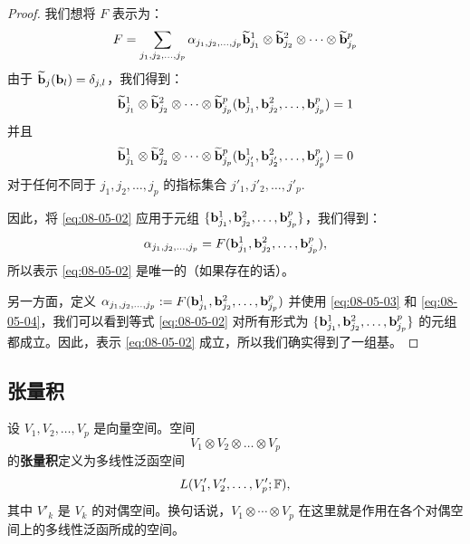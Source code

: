 \begin{proof}
我们想将 $F$ 表示为：
\begin{equation}\label{eq:08-05-02}
F = \sum_{j_1, j_2, \dots, j_p} \alpha_{j_1, j_2, \dots, j_p} \widetilde{\mathbf{b}}^{1}_{j_1} \otimes \widetilde{\mathbf{b}}^{2}_{j_2} \otimes \dots \otimes \widetilde{\mathbf{b}}^{p}_{j_p}
\end{equation}
由于 $\widetilde{\mathbf{b}}_{j}(\mathbf{b}_{l}) = \delta_{j,l}$，我们得到：
\begin{equation}\label{eq:08-05-03}
\widetilde{\mathbf{b}}^{1}_{j_1} \otimes \widetilde{\mathbf{b}}^{2}_{j_2} \otimes \dots \otimes \widetilde{\mathbf{b}}^{p}_{j_p} (\mathbf{b}^{1}_{j_1}, \mathbf{b}^{2}_{j_2}, \dots, \mathbf{b}^{p}_{j_p}) = 1
\end{equation}
并且
\begin{equation}\label{eq:08-05-04}
\widetilde{\mathbf{b}}^{1}_{j_1} \otimes \widetilde{\mathbf{b}}^{2}_{j_2} \otimes \dots \otimes \widetilde{\mathbf{b}}^{p}_{j_p} (\mathbf{b}^{1}_{j'_1}, \mathbf{b}^{2}_{j'_2}, \dots, \mathbf{b}^{p}_{j'_p}) = 0
\end{equation}
对于任何不同于 $j_1, j_2, \dots, j_p$ 的指标集合 $j'_1, j'_2, \dots, j'_p$.

因此，将 \eqref{eq:08-05-02} 应用于元组 $\{\mathbf{b}^{1}_{j_1}, \mathbf{b}^{2}_{j_2}, \dots, \mathbf{b}^{p}_{j_p}\}$，我们得到：
$$ \alpha_{j_1, j_2, \dots, j_p} = F(\mathbf{b}^{1}_{j_1}, \mathbf{b}^{2}_{j_2}, \dots, \mathbf{b}^{p}_{j_p}) ,$$
所以表示 \eqref{eq:08-05-02} 是唯一的（如果存在的话）。

另一方面，定义 $\alpha_{j_1, j_2, \dots, j_p} := F(\mathbf{b}^{1}_{j_1}, \mathbf{b}^{2}_{j_2}, \dots, \mathbf{b}^{p}_{j_p})$ 并使用 \eqref{eq:08-05-03} 和 \eqref{eq:08-05-04}，我们可以看到等式 \eqref{eq:08-05-02} 对所有形式为 $\{\mathbf{b}^{1}_{j_1}, \mathbf{b}^{2}_{j_2}, \dots, \mathbf{b}^{p}_{j_p}\}$ 的元组都成立。因此，表示 \eqref{eq:08-05-02} 成立，所以我们确实得到了一组基。\end{proof}

\subsection{张量积}\label{sec:08-05-02}


\begin{definition*}
设 $V_1, V_2, \dots, V_p$ 是向量空间。空间
$$V_1 \otimes V_2 \otimes \dots \otimes V_p$$
的\textbf{张量积}定义为多线性泛函空间
$$L(V'_1,V'_2,\dots,V'_p;\mathbb{F}),$$
其中 $V'_k$ 是 $V_k$ 的对偶空间。换句话说，$V_1\otimes\cdots\otimes V_p$ 在这里就是作用在各个对偶空间上的多线性泛函所成的空间。
\end{definition*}


